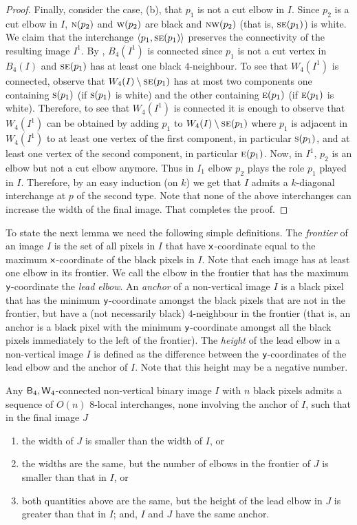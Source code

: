 \documentclass[lotsofwhite,charterfonts]{patmorin}
\newcommand{\fourfour}{\ensuremath{\protect\textup{\textsf{B}}_{4},\protect\textup{\textsf{W}}_{4}}}
\newcommand{\N}{\textsc{n}}
\newcommand{\E}{\textsc{e}}
\newcommand{\SE}{\textsc{se}}
\renewcommand{\S}{\textsc{s}}
\newcommand{\W}{\textsc{w}}
\newcommand{\NW}{\textsc{nw}}
\newcommand{\x}{\ensuremath{\protect\textup{\textsf{x}}}}
\newcommand{\y}{\ensuremath{\protect\textup{\textsf{y}}}}
\newcommand{\ic}[2]{\langle #1,#2 \rangle}
\newcommand{\sm}{\ensuremath{\setminus}}
\begin{document}
\begin{proof}
Finally, consider the case, (b), that $p_1$ is not a cut elbow in $I$. Since
$p_2$ is a cut elbow in $I$, $\N(p_2)$ and $\W(p_2)$ are black and
$\NW(p_2)$ (that is, $\SE(p_1)$) is white. We claim that the
interchange $\ic{p_1}{\SE(p_1)}$ preserves the connectivity of the
resulting image $I^1$. By , $B_4(I^1)$ is connected
since $p_1$ is not a cut vertex in $B_4(I)$ and $\SE(p_1)$ has at
least one black $4$-neighbour. To see that $W_4(I^1)$ is connected,
observe that $W_4(I)\sm \SE(p_1)$ has at most two components one
containing $\S(p_1)$ (if $\S(p_1)$ is white) and the other containing
$\E(p_1)$ (if $\E(p_1)$ is white). Therefore, to see that $W_4(I^1)$
is connected it is enough to observe that $W_4(I^1)$ can be obtained
by adding $p_1$ to $W_4(I)\sm \SE(p_1)$ where $p_1$ is adjacent in
$W_4(I^1)$ to at least one vertex of the first component, in
particular $\S(p_1)$, and at least one vertex of the second component,
in particular $\E(p_1)$. Now, in $I^1$, $p_2$ is an elbow but not a
cut elbow anymore. Thus in $I_1$ elbow $p_2$ plays the role $p_1$
played in $I$. Therefore, by an easy induction (on $k$) we get that
$I$ admits a $k$-diagonal interchange at $p$ of the second type. Note
that none of the above interchanges can increase the width of the
final image. That completes the proof.  
\end{proof}

To state the next lemma we need the following simple definitions.  The
\emph{frontier} of an image $I$ is the set of all pixels in $I$ that
have \x-coordinate equal to the maximum \x-coordinate of the black
pixels in $I$. Note that each image has at least one elbow in its
frontier. We call the elbow in the frontier that has the maximum
\y-coordinate the \emph{lead elbow}. An \emph{anchor} of a
non-vertical image $I$ is a black pixel that has the minimum
\y-coordinate amongst the black pixels that are not in the frontier,
but have a (not necessarily black) $4$-neighbour in the frontier (that
is, an anchor is a black pixel with the minimum \y-coordinate amongst all
the black pixels immediately to the left of the frontier). The
\emph{height} of the lead elbow in a non-vertical image $I$ is defined
as the difference between the \y-coordinates of the lead elbow and the
anchor of $I$. Note that this height may be a negative number.


\begin{lem}
Any \fourfour-connected non-vertical binary image $I$ with $n$ black pixels admits a sequence of $O(n)$ 8-local interchanges, none involving the anchor of $I$, such that in the final image $J$

\begin{enumerate}
\item the width of $J$ is smaller than the width of $I$, or 
\item the widths are the same, but the number of elbows in the frontier of $J$ is smaller than that in $I$, or
\item both quantities above are the same, but the height of the lead elbow in $J$ is greater than that in $I$; and, $I$ and $J$ have the same anchor.
\end{enumerate}
\end{lem}
\end{document}

